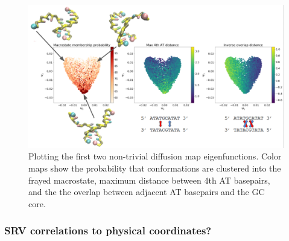 \documentclass[journal=jpcbfk,manuscript=article]{achemso}
\begin{document}
\begin{figure}[ht!]
	\begin{center}
        \includegraphics[width=\textwidth]{Figs/figs_0804/GC-core_dmaps.png}
        \caption{Plotting the first two non-trivial diffusion map eigenfunctions. Color maps show the probability that conformations are clustered into the frayed macrostate, maximum distance between 4th AT basepairs, and the the overlap between adjacent AT basepairs and the GC core.}
        \label{fig:GC-core_dmaps}
	\end{center}
\end{figure}

\subsubsection{SRV correlations to physical coordinates?}
\end{document}
